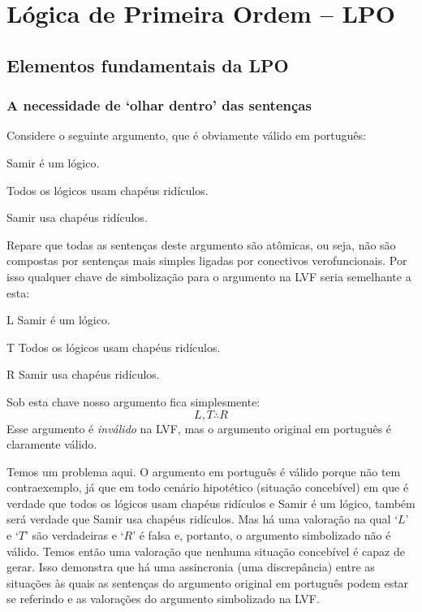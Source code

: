 \normalsize
\part{Lógica de Primeira Ordem --  LPO}
\label{ch.FOL}
\chapter{Elementos fundamentais da LPO}\label{s:FOLBuildingBlocks}

\section[Olhar dentro das sentenças]{A necessidade de `olhar dentro' das sentenças}
Considere o seguinte argumento, que é obviamente válido em português:
\begin{earg}
	\item[] Samir é um lógico.
	\item[] Todos os lógicos usam chapéus ridículos.
	\item[\therefore] Samir usa chapéus ridículos.
	\label{willard1}
\end{earg}
Repare que todas as sentenças deste argumento são atômicas, ou seja, não são compostas por sentenças mais simples ligadas por conectivos verofuncionais.
Por isso qualquer chave de simbolização para o argumento na LVF seria semelhante a esta:
\begin{ekey}
\item[L] Samir é um lógico.
\item[T] Todos os lógicos usam chapéus ridículos.
\item[R] Samir usa chapéus ridículos.
\end{ekey}
Sob esta chave nosso argumento fica simplesmente:
$$L, T \therefore R$$
Esse argumento é \emph{inválido} na LVF, mas o argumento original em português é claramente válido.

Temos um problema aqui.
O argumento em português é válido porque não tem contraexemplo, já que em todo cenário hipotético (situação concebível) em que é verdade que todos os lógicos usam chapéus ridículos e Samir é um lógico, também será verdade que Samir usa chapéus ridículos.
Mas há uma valoração na qual `$L$' e `$T$' são verdadeiras e `$R$' é falsa e, portanto, o argumento simbolizado não é válido.
Temos então uma valoração que nenhuma situação concebível é capaz de gerar.
Isso demonstra que há uma assincronia (uma discrepância) entre as situações às quais as sentenças do  argumento original em português podem estar se referindo e as valorações do argumento simbolizado na LVF.

